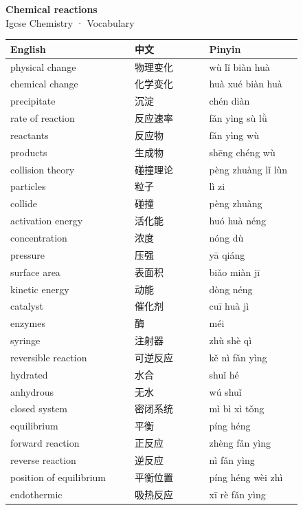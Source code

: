 \documentclass[11pt]{article}
\begin{document}
\begin{center}
  {\LARGE\bfseries Chemical reactions}\\[0.35em]
  {\large Igcse Chemistry · Vocabulary}
\end{center}
\vspace{0.6em}

\begin{longtable}{@{}p{0.40\linewidth}p{0.24\linewidth}p{0.30\linewidth}@{}}
\toprule
\textbf{English} & \textbf{中文} & \textbf{Pinyin} \\
\midrule
\endhead
\bottomrule
\endlastfoot
physical change & 物理变化 & wù lǐ biàn huà \\
chemical change & 化学变化 & huà xué biàn huà \\
precipitate & 沉淀 & chén diàn \\
rate of reaction & 反应速率 & fǎn yìng sù lǜ \\
reactants & 反应物 & fǎn yìng wù \\
products & 生成物 & shēng chéng wù \\
collision theory & 碰撞理论 & pèng zhuàng lǐ lùn \\
particles & 粒子 & lì zi \\
collide & 碰撞 & pèng zhuàng \\
activation energy & 活化能 & huó huà néng \\
concentration & 浓度 & nóng dù \\
pressure & 压强 & yā qiáng \\
surface area & 表面积 & biǎo miàn jī \\
kinetic energy & 动能 & dòng néng \\
catalyst & 催化剂 & cuī huà jì \\
enzymes & 酶 & méi \\
syringe & 注射器 & zhù shè qì \\
reversible reaction & 可逆反应 & kě nì fǎn yìng \\
hydrated & 水合 & shuǐ hé \\
anhydrous & 无水 & wú shuǐ \\
closed system & 密闭系统 & mì bì xì tǒng \\
equilibrium & 平衡 & píng héng \\
forward reaction & 正反应 & zhèng fǎn yìng \\
reverse reaction & 逆反应 & nì fǎn yìng \\
position of equilibrium & 平衡位置 & píng héng wèi zhì \\
endothermic & 吸热反应 & xī rè fǎn yìng \\

\end{longtable}
\end{document}
